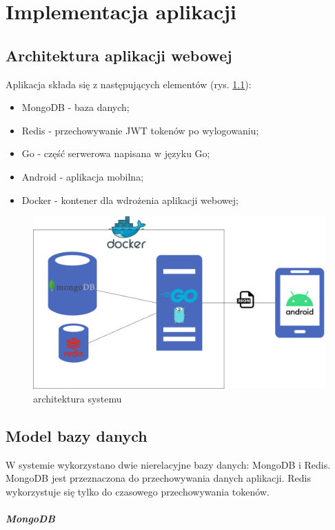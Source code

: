 \chapter{Implementacja aplikacji}
%
\section{Architektura aplikacji webowej}
Aplikacja składa się z następujących elementów (rys. \ref{fig:systemarchitecturediagram}):
\begin{itemize}
\item MongoDB - baza danych;
\item Redis \cite{redis} - przechowywanie JWT tokenów po wylogowaniu;
\item Go - część serwerowa napisana w języku Go;
\item Android - aplikacja mobilna;
\item Docker - kontener dla wdrożenia aplikacji webowej;
\end{itemize}
\begin{figure}[ht]
\centering
\includegraphics[width=0.8\linewidth]{rys03/system_architecture_diagram.png}
\caption{architektura systemu \cite{diagrams_net}}
\label{fig:systemarchitecturediagram}
\end{figure}
\section{Model bazy danych}
W systemie wykorzystano dwie nierelacyjne bazy danych: MongoDB i Redis.
MongoDB jest przeznaczona do przechowywania danych aplikacji.
Redis wykorzystuje się tylko do czasowego przechowywania tokenów.

% 
\paragraph{MongoDB}

